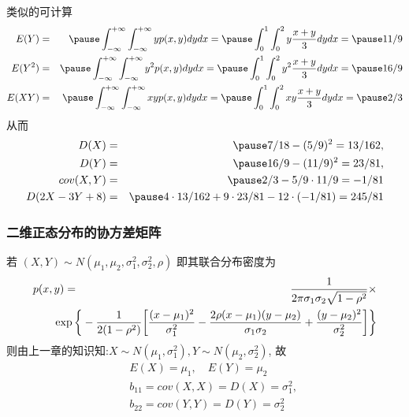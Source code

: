 \documentclass[Prob-All.tex]{subfiles}
\begin{document}
\begin{frame}
	类似的可计算
	\begin{eqnarray*}
		E(Y)&=&\pause \int_{-\infty}^{+\infty}\int_{-\infty}^{+\infty}yp(x,y)dydx=\pause \int_0^1\int_0^2y\dfrac{x+y}{3}dydx=\pause 11/9\\
		E(Y^2)&=&\pause \int_{-\infty}^{+\infty}\int_{-\infty}^{+\infty}y^2p(x,y)dydx=\pause \int_0^1\int_0^2y^2\dfrac{x+y}{3}dydx=\pause 16/9\\
		E(XY)&=&\pause \int_{-\infty}^{+\infty}\int_{-\infty}^{+\infty}xyp(x,y)dydx=\pause \int_0^1\int_0^2xy\dfrac{x+y}{3}dydx=\pause 2/3
	\end{eqnarray*}
	\pause 从而
	\begin{eqnarray*}
		D(X)&=&\pause 7/18-(5/9)^2=13/162, \\
		D(Y)&=&\pause 16/9-(11/9)^2=23/81, \\
		cov(X,Y)&=&\pause 2/3-5/9\cdot 11/9=-1/81\\
		D(2X-3Y+8)&=&\pause 4\cdot 13/162+9\cdot 23/81-12\cdot (-1/81)=245/81
	\end{eqnarray*}

\end{frame}
\begin{frame}
	\frametitle{二维正态分布的协方差矩阵}
	若 $(X,Y)\sim N (\mu_1,\mu_2,\sigma_1^2,\sigma_2^2,\rho)$ 即其联合分布密度为
	\pause  \begin{eqnarray*}
		p(x,y)&=&\dfrac{1}{2\pi \sigma_1\sigma_2\sqrt{1-\rho^2}}\times\\
		&&\hspace{-1cm}\exp\bigg\{-\dfrac{1}{2(1-\rho^2)}\bigg[\dfrac{(x-\mu_1)^2}{\sigma_1^2}-\dfrac{2\rho(x-\mu_1)(y-\mu_2)}{\sigma_1\sigma_2}+\dfrac{(y-\mu_2)^2}{\sigma_2^2}\bigg]\bigg\}
	\end{eqnarray*}
	则由上一章的知识知:\pause  $X\sim N (\mu_1,\sigma_1^2), Y\sim N (\mu_2,\sigma_2^2)$, 故 \pause
	\begin{eqnarray*}
		&& E(X)=\mu_1, \quad E(Y)=\mu_2\\
		&&b_{11}=cov(X,X)=D(X)=\sigma_1^2,\\
		&& b_{22}=cov(Y,Y)=D(Y)=\sigma_2^2
	\end{eqnarray*}

\end{frame}
\end{document}
